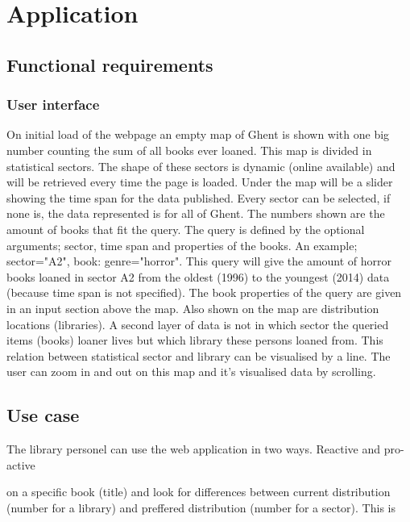 \chapter{Application}


\section{Functional requirements}

\subsection{User interface}

On initial load of the webpage an empty map of Ghent is shown with one big number counting the sum of all books ever loaned. This map is divided in statistical sectors. The shape of these sectors is dynamic (online available) and will be retrieved every time the page is loaded. Under the map will be a slider showing the time span for the data published. Every sector can be selected, if none is, the data represented is for all of Ghent.  The numbers shown are the amount of books that fit the query. The query is defined by the optional arguments; sector, time span and properties of the books. An example; sector="A2", book: genre="horror". This query will give the amount of horror books loaned in sector A2 from the oldest (1996) to the youngest (2014) data (because time span is not specified). The book properties of the query are given in an input section above the map. Also shown on the map are distribution locations (libraries). A second layer of data is not in which sector the queried items (books) loaner lives but which library these persons  loaned from. This relation between statistical sector and library can be visualised by a line. The user can zoom in and out on this map and it's visualised data by scrolling. 

\section{Use case}

The library personel can use the web application in two ways. Reactive and pro-active


 on a specific book (title) and look for differences between current distribution (number for a library) and preffered distribution (number for a sector). This is 